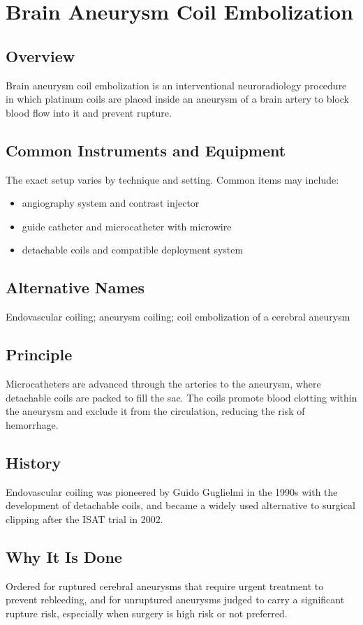 \chapter{Brain Aneurysm Coil Embolization}

\section*{Overview}
Brain aneurysm coil embolization is an interventional neuroradiology procedure in which platinum coils are placed inside an aneurysm of a brain artery to block blood flow into it and prevent rupture.
\section*{Common Instruments and Equipment}
The exact setup varies by technique and setting. Common items may include:
\begin{itemize}[nosep,leftmargin=*]
  \item angiography system and contrast injector
  \item guide catheter and microcatheter with microwire
  \item detachable coils and compatible deployment system
\end{itemize}

\section*{Alternative Names}
Endovascular coiling; aneurysm coiling; coil embolization of a cerebral aneurysm
\section*{Principle}
Microcatheters are advanced through the arteries to the aneurysm, where detachable coils are packed to fill the sac. The coils promote blood clotting within the aneurysm and exclude it from the circulation, reducing the risk of hemorrhage.
\section*{History}
Endovascular coiling was pioneered by Guido Guglielmi in the 1990s with the development of detachable coils, and became a widely used alternative to surgical clipping after the ISAT trial in 2002.
\section*{Why It Is Done}
Ordered for ruptured cerebral aneurysms that require urgent treatment to prevent rebleeding, and for unruptured aneurysms judged to carry a significant rupture risk, especially when surgery is high risk or not preferred.
